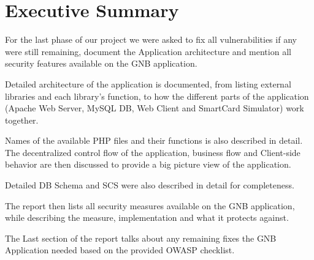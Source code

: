 \chapter{Executive Summary}

For the last phase of our project we were asked to fix all vulnerabilities if any were still remaining, document the Application architecture and mention all security features available on the GNB application.

Detailed architecture of the application is documented, from listing external libraries and each library's function, to how the different parts of the application (Apache Web Server, MySQL DB, Web Client and SmartCard Simulator) work together.

Names of the available PHP files and their functions is also described in detail. The decentralized control flow of the application, business flow and Client-side behavior are then discussed to provide a big picture view of the application.

Detailed DB Schema and SCS were also described in detail for completeness.

The report then lists all security measures available on the GNB application, while describing the measure, implementation and what it protects against.

The Last section of the report talks about any remaining fixes the GNB Application needed based on the provided OWASP checklist.
